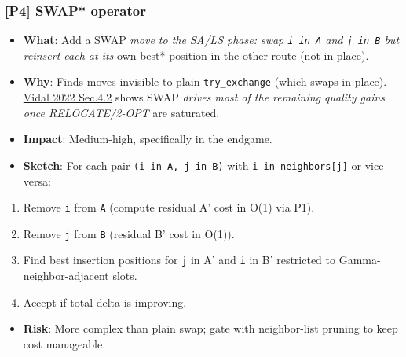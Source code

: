 \documentclass[twocolumn,10pt,letterpaper]{article}
\begin{document}
\subsubsection{[P4] SWAP* operator}
\begin{itemize}
\setlength{\itemsep}{0pt}
\setlength{\parskip}{0pt}
  \item \textbf{What}: Add a SWAP\textit{ move to the SA/LS phase: swap \texttt{i in A} and \texttt{j in B} but reinsert each at its }own best* position in the other route (not in place).
  \item \textbf{Why}: Finds moves invisible to plain \texttt{try\_exchange} (which swaps in place). \href{https://arxiv.org/abs/2012.10384}{Vidal 2022 Sec.4.2} shows SWAP\textit{ drives most of the remaining quality gains once RELOCATE/2-OPT} are saturated.
  \item \textbf{Impact}: Medium-high, specifically in the endgame.
  \item \textbf{Sketch}: For each pair \texttt{(i in A, j in B)} with \texttt{i in neighbors[j]} or vice versa:
\end{itemize}
\begin{enumerate}
\setlength{\itemsep}{0pt}
\setlength{\parskip}{0pt}
  \item Remove \texttt{i} from \texttt{A} (compute residual A' cost in O(1) via P1).
  \item Remove \texttt{j} from \texttt{B} (residual B' cost in O(1)).
  \item Find best insertion positions for \texttt{j} in A' and \texttt{i} in B' restricted to Gamma-neighbor-adjacent slots.
  \item Accept if total delta is improving.
\end{enumerate}
\begin{itemize}
\setlength{\itemsep}{0pt}
\setlength{\parskip}{0pt}
  \item \textbf{Risk}: More complex than plain swap; gate with neighbor-list pruning to keep cost manageable.
\end{itemize}
\end{document}
